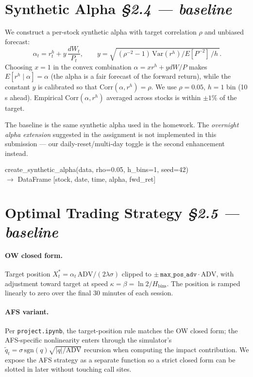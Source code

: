 \documentclass[11pt,a4paper]{article}
\begin{document}
\section{Synthetic Alpha \hfill \normalsize\itshape \S2.4 --- baseline}

We construct a per-stock synthetic alpha with target correlation
$\rho$ and unbiased forecast:
\[
  \alpha_t = r^h_t + y\,\frac{dW_t}{P_t},
  \qquad
  y = \sqrt{\,(\rho^{-2}-1)\,\mathrm{Var}(r^h)/E[P^{-2}]\,/h\,}.
\]
Choosing $x=1$ in the convex combination $\alpha = x r^h + y dW/P$
makes $E[r^h \mid \alpha] = \alpha$ (the alpha is a fair forecast of the
forward return), while the constant $y$ is calibrated so that
$\mathrm{Corr}(\alpha,r^h) = \rho$.  We use $\rho=0.05$, $h=1$ bin
(10\,s ahead).  Empirical $\mathrm{Corr}(\alpha, r^h)$ averaged across
stocks is within $\pm 1\%$ of the target.

The baseline is the same synthetic alpha used in the homework.  The
\emph{overnight alpha extension} suggested in the assignment is not
implemented in this submission --- our daily-reset/multi-day toggle is
the second enhancement instead.

\begin{sigbox}
\noindent
create\_synthetic\_alpha(data, rho=0.05, h\_bins=1, seed=42)\\
\hspace*{1em}$\rightarrow$ DataFrame [stock, date, time, alpha, fwd\_ret]
\end{sigbox}

\section{Optimal Trading Strategy \hfill \normalsize\itshape \S2.5 --- baseline}
\label{sec:strategy}

\paragraph{OW closed form.}  Target position
$X^*_t = \alpha_t\,\mathrm{ADV}/(2\lambda\sigma)$ clipped to
$\pm\,\texttt{max\_pos\_adv}\cdot\mathrm{ADV}$, with adjustment toward
target at speed $\kappa = \beta = \ln 2/H_{\text{bins}}$.  The position
is ramped linearly to zero over the final 30 minutes of each session.

\paragraph{AFS variant.}  Per \texttt{project.ipynb}, the target-position
rule matches the OW closed form; the AFS-specific nonlinearity enters
through the simulator's $\tilde q_t = \sigma\,\mathrm{sgn}(q)\sqrt{|q|/\mathrm{ADV}}$
recursion when computing the impact contribution.  We expose the AFS
strategy as a separate function so a strict closed form can be slotted
in later without touching call sites.
\end{document}
